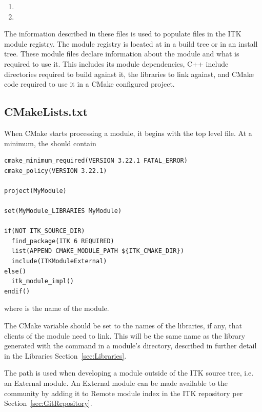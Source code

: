 \begin{enumerate}
  \item {}
  \item {}
\end{enumerate}

The information described in these files is used to populate 
files in the ITK module registry. The module registry is located
at  in a
build tree or
in an install tree. These module files declare information about the module
and what is required to use it. This includes its module dependencies, C++ include
directories required to build against it, the libraries to link against, and CMake
code required to use it in a CMake configured project.


\subsection{CMakeLists.txt}

When CMake starts processing a module, it begins with the top level
 file. At a minimum, the  should
contain

\begin{verbatim}
cmake_minimum_required(VERSION 3.22.1 FATAL_ERROR)
cmake_policy(VERSION 3.22.1)

project(MyModule)

set(MyModule_LIBRARIES MyModule)

if(NOT ITK_SOURCE_DIR)
  find_package(ITK 6 REQUIRED)
  list(APPEND CMAKE_MODULE_PATH ${ITK_CMAKE_DIR})
  include(ITKModuleExternal)
else()
  itk_module_impl()
endif()
\end{verbatim}

where  is the name of the module.

The CMake variable  should be set to the names
of the libraries, if any, that clients of the module need to link. This will be
the same name as the library generated with the  command in
a module's  directory, described in further detail in the Libraries
Section~\ref{sec:Libraries}.

The path  is used when developing a module outside of the
ITK source tree, i.e. an External module. An External module can be made
available to the community by adding it to 
Remote module index in the ITK repository per Section~\ref{sec:GitRepository}.

